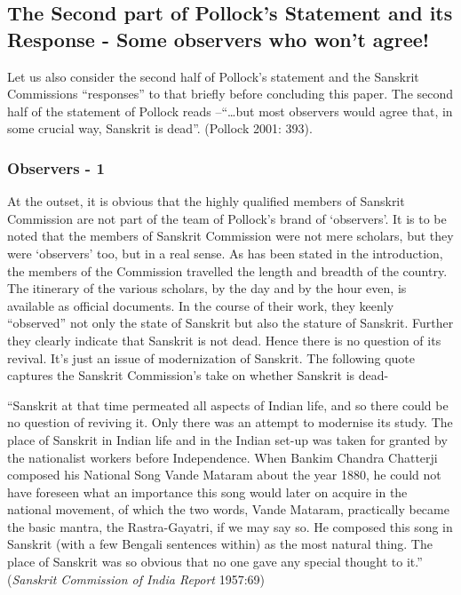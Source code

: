 \subsection{The Second part of Pollock’s Statement and its Response - Some observers who won’t agree!}

Let us also consider the second half of Pollock’s statement and the Sanskrit Commissions “responses” to that briefly before concluding this paper. The second half of the statement of Pollock reads –“…but most observers would agree that, in some crucial way, Sanskrit is dead”. (Pollock 2001: 393). 

\makeatletter
\renewcommand\thesubsubsection{\thesubsection.\@alph\c@subsubsection}
\makeatother

\subsubsection{Observers - 1}

At the outset, it is obvious that the highly qualified members of Sanskrit Commission are not part of the team of Pollock’s brand of ‘observers’. It is to be noted that the members of Sanskrit Commission were not mere scholars, but they were ‘observers’ too, but in a real sense. As has been stated in the introduction, the members of the Commission travelled the length and breadth of the country. The itinerary of the various scholars, by the day and by the hour even, is available as official documents. In the course of their work, they keenly “observed” not only the state of Sanskrit but also the stature of Sanskrit. Further they clearly indicate that Sanskrit is not dead. Hence there is no question of its revival. It’s just an issue of  modernization of Sanskrit. The following quote captures the Sanskrit Commission’s take on whether Sanskrit is dead-
\begin{myquote}
\eleven
“Sanskrit at that time permeated all aspects of Indian life, and so there could be no question of reviving it. Only there was an attempt to modernise its study. The place of Sanskrit in Indian life and in the Indian set-up was taken for granted by the nationalist workers before Independence. When Bankim Chandra Chatterji composed his National Song Vande Mataram about the year 1880, he could not have foreseen what an importance this song would later on acquire in the national movement, of which the two words, Vande Mataram, practically became the basic mantra, the Rastra-Gayatri, if we may say so. He composed this song in Sanskrit (with a few Bengali sentences within) as the most natural thing. The place of Sanskrit was so obvious that no one gave any special thought to it.” \hfill({\sl Sanskrit Commission of India Report} 1957:69)
\end{myquote}

